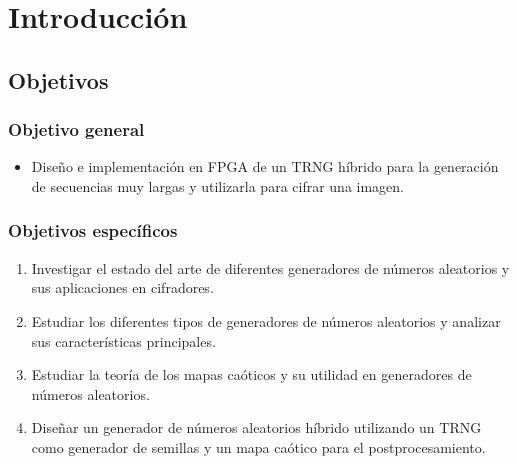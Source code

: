 \chapter{Introducción}

    
	
	\section{Objetivos}
	
		\subsection{Objetivo general}
			\begin{itemize}
				\item Diseño e implementación en FPGA de un TRNG híbrido para la generación de secuencias muy largas y utilizarla para cifrar una imagen.
			\end{itemize}
		
		\subsection{Objetivos específicos}
			\begin{enumerate}
                \item Investigar el estado del arte de diferentes generadores de números aleatorios y sus aplicaciones en cifradores.
                \item Estudiar los diferentes tipos de generadores de números aleatorios y analizar sus características principales.
                \item Estudiar la teoría de los mapas caóticos y su utilidad en generadores de números aleatorios.
                \item Diseñar un generador de números aleatorios híbrido utilizando un TRNG como generador de semillas y un mapa caótico para el postprocesamiento.
			\end{enumerate}

